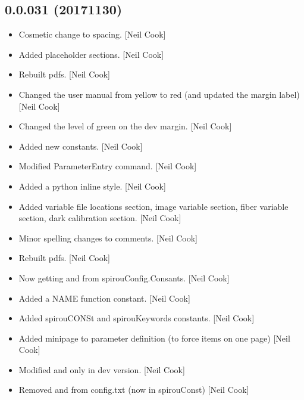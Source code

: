 \documentclass[a4paper,10pt,english]{report}
\begin{document}
\subsection{0.0.031 (2017\sphinxhyphen{}11\sphinxhyphen{}30)}
\label{\detokenize{misc/changelog:id540}}\begin{itemize}
\item {} 
Cosmetic change to spacing. {[}Neil Cook{]}

\item {} 
Added placeholder sections. {[}Neil Cook{]}

\item {} 
Rebuilt pdfs. {[}Neil Cook{]}

\item {} 
Changed the user manual from yellow to red (and updated the margin
label) {[}Neil Cook{]}

\item {} 
Changed the level of green on the dev margin. {[}Neil Cook{]}

\item {} 
Added new constants. {[}Neil Cook{]}

\item {} 
Modified ParameterEntry command. {[}Neil Cook{]}

\item {} 
Added a python inline style. {[}Neil Cook{]}

\item {} 
Added variable file locations section, image variable section, fiber
variable section, dark calibration section. {[}Neil Cook{]}

\item {} 
Minor spelling changes to comments. {[}Neil Cook{]}

\item {} 
Rebuilt pdfs. {[}Neil Cook{]}

\item {} 
Now getting  and  from spirouConfig.Consants. {[}Neil
Cook{]}

\item {} 
Added a NAME function constant. {[}Neil Cook{]}

\item {} 
Added spirouCONSt and spirouKeywords constants. {[}Neil Cook{]}

\item {} 
Added minipage to parameter definition (to force items on one page)
{[}Neil Cook{]}

\item {} 
Modified  and  \sphinxhyphen{} only in dev version. {[}Neil Cook{]}

\item {} 
Removed  and  from config.txt (now in spirouConst)
{[}Neil Cook{]}

\end{itemize}
\end{document}
